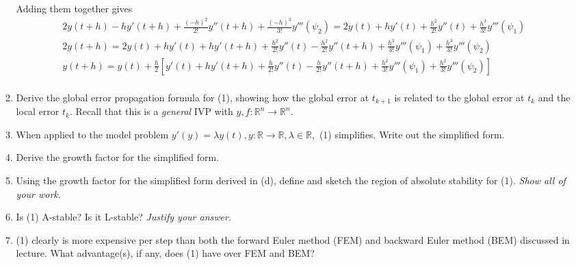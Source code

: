 \documentclass{article}
\begin{document}
\begin{enumerate}
\begin{enumerate}
               Adding them together gives 
               \begin{align*}
               2y(t + h) - hy'(t + h) 
               + \frac{(-h)^2}{2!} y''(t+h) 
               + \frac{(-h)^3}{3!}y'''(\psi_2)
               = 2y(t) + hy'(t) + \frac{h^2}{2!} y''(t) 
               + \frac{h^3}{3!}y'''(\psi_1) \\
               2y(t + h) 
               = 2y(t) + hy'(t) + hy'(t + h) + \frac{h^2}{2!} y''(t) 
               - \frac{h^2}{2!} y''(t+h) 
               + \frac{h^3}{3!}y'''(\psi_1) 
               + \frac{h^3}{3!}y'''(\psi_2) \\
               y(t + h) 
               = y(t) + \frac{h}{2}
               [y'(t) + hy'(t + h) + \frac{h}{2!} y''(t) 
               - \frac{h}{2!} y''(t+h) 
               + \frac{h^2}{3!}y'''(\psi_1) 
               + \frac{h^2}{3!}y'''(\psi_2)] \\
               \end{align*}
            \item Derive the global error propagation formula for (1),
                showing how the global error at $t_{k+1}$ is related
                to the global error at $t_k$ and the local error $t_k$.
                Recall that this is a \textit{general} IVP with $y,f:
                \mathbb{R}^n \rightarrow \mathbb{R}^n$.
            \item When applied to the model problem $y'(y) = \lambda y(t),
                y: \mathbb{R} \rightarrow \mathbb{R}, \lambda \in 
                \mathbb{R},$ (1) simplifies. Write out the simplified form.

            \item Derive the growth factor for the simplified form.
            \item Using the growth factor for the simplified form derived
                in (d), define and sketch the region of absolute stability
                for (1). \textit{Show all of your work.}
            \item Is (1) A-stable? Is it L-stable? \textit{Justify your 
                answer}.
            \item (1) clearly is more expensive per step than both the
                forward Euler method (FEM) and backward Euler method
                (BEM) discussed in lecture. What advantage(s), if any,
                does (1) have over FEM and BEM?
        \end{enumerate}
\end{enumerate}
\end{document}
